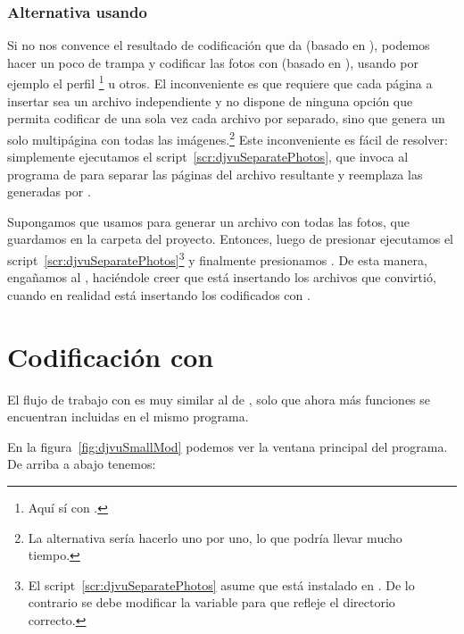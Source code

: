 \documentclass[%
	a5paper,
	10pt,
	twoside,
	openright,
	final,
]{memoir}
\begin{document}
	\subsubsection{Alternativa usando \djvusmall} Si no nos convence el resultado de codificación que da \djvuimager (basado en \djvulibre), podemos hacer un poco de trampa y codificar las fotos con \djvusmall (basado en \dexpress), usando por ejemplo el perfil \footnote{Aquí sí con .} u otros. El inconveniente es que \djvuimager requiere que cada página a insertar sea un archivo \djvu independiente y \djvusmall no dispone de ninguna opción que permita codificar de una sola vez cada archivo por separado, sino que genera un solo \djvu multipágina con todas las imágenes.\footnote{La alternativa sería hacerlo uno por uno, lo que podría llevar mucho tiempo.} Este inconveniente es fácil de resolver: simplemente ejecutamos el script~\ref{scr:djvuSeparatePhotos}, que invoca al programa  de \djvulibre para separar las páginas del archivo resultante y reemplaza las generadas por \djvuimager.


	Supongamos que usamos \djvusmall para generar un archivo  con todas las fotos, que guardamos en la carpeta  del proyecto. Entonces, luego de presionar  ejecutamos el script~\ref{scr:djvuSeparatePhotos}\footnote{El script~\ref{scr:djvuSeparatePhotos} asume que \djvuimager está instalado en . De lo contrario se debe modificar la variable  para que refleje el directorio correcto.} y finalmente presionamos . De esta manera, engañamos al \djvuimager, haciéndole creer que está insertando los archivos que convirtió, cuando en realidad está insertando los codificados con \djvusmall.

	\section{Codificación con \djvusmallmod\label{sec:djvuSmallMod}} El flujo de trabajo con \djvusmallmod es muy similar al de \djvusmall, solo que ahora más funciones se encuentran incluidas en el mismo programa.

	En la figura~\ref{fig:djvuSmallMod} podemos ver la ventana principal del programa. De arriba a abajo tenemos:
\end{document}
